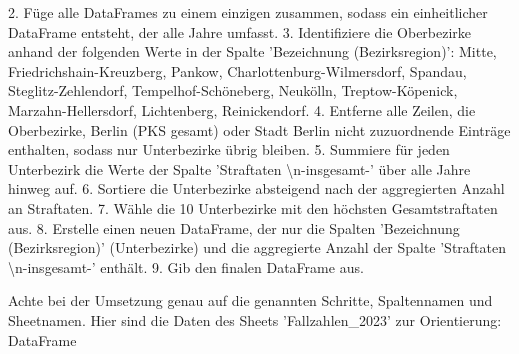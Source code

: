 \documentclass[11pt,a4paper]{article}
\begin{document}
\begin{itemize}
{        2. Füge alle DataFrames zu einem einzigen zusammen, sodass ein einheitlicher DataFrame entsteht, der alle Jahre umfasst.
        3. Identifiziere die Oberbezirke anhand der folgenden Werte in der Spalte 'Bezeichnung (Bezirksregion)': 
           Mitte, Friedrichshain-Kreuzberg, Pankow, Charlottenburg-Wilmersdorf, Spandau, Steglitz-Zehlendorf, Tempelhof-Schöneberg, Neukölln, Treptow-Köpenick, Marzahn-Hellersdorf, Lichtenberg, Reinickendorf.
        4. Entferne alle Zeilen, die Oberbezirke, Berlin (PKS gesamt) oder Stadt Berlin nicht zuzuordnende Einträge enthalten, sodass nur Unterbezirke übrig bleiben.
        5. Summiere für jeden Unterbezirk die Werte der Spalte 'Straftaten \textbackslash n-insgesamt-' über alle Jahre hinweg auf.
        6. Sortiere die Unterbezirke absteigend nach der aggregierten Anzahl an Straftaten.
        7. Wähle die 10 Unterbezirke mit den höchsten Gesamtstraftaten aus.
        8. Erstelle einen neuen DataFrame, der nur die Spalten 'Bezeichnung (Bezirksregion)' (Unterbezirke) und die aggregierte Anzahl der Spalte 'Straftaten \textbackslash n-insgesamt-' enthält.
        9. Gib den finalen DataFrame aus.
        
        Achte bei der Umsetzung genau auf die genannten Schritte, Spaltennamen und Sheetnamen.
        Hier sind die Daten des Sheets 'Fallzahlen\_2023' zur Orientierung:
        DataFrame}
    \end{itemize}
\end{document}
